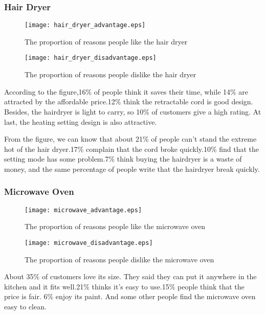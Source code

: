\documentclass{mcmthesis}
\begin{document}
	
	\subsubsection{Hair Dryer}
	\begin{figure}[H]
		\begin{minipage}[t]{0.5\textwidth}
			\centering
			\texttt{[image: hair\_dryer\_advantage.eps]}
			\caption{The proportion of reasons people like the hair dryer}
		\end{minipage}
		\qquad
		\begin{minipage}[t]{0.5\textwidth}
			\centering
			\texttt{[image: hair\_dryer\_disadvantage.eps]}
			\caption{The proportion of reasons people dislike the hair dryer }
		\end{minipage}
	\end{figure}
	
	According to the figure,16\% of people think it saves their time, while 14\% are attracted by the affordable price.12\% think the retractable cord is good design. Besides, the hairdryer is light to carry, so 10\% of customers give a high rating. At last, the heating setting design is also attractive.
	
	From the figure, we can know that about 21\% of people can't stand the extreme hot of the hair dryer.17\% complain that the cord broke quickly.10\% find that the setting mode has some problem.7\% think buying the hairdryer is a waste of money, and the same percentage of people write that the hairdryer break quickly.
	
	\subsubsection{Microwave Oven}
	\begin{figure}[H]
		\begin{minipage}[t]{0.5\textwidth}
			\centering
			\texttt{[image: microwave\_advantage.eps]}
			\caption{The proportion of reasons people like the microwave oven\label{fig:1}}
		\end{minipage}
		\qquad
		\begin{minipage}[t]{0.5\textwidth}
			\centering
			\texttt{[image: microwave\_disadvantage.eps]}
			\caption{The proportion of reasons people dislike the microwave oven\label{fig:2}}
		\end{minipage}
	\end{figure}
	
	About 35\% of customers love its size. They said they can put it anywhere in the kitchen and it fits well.21\% thinks it's easy to use.15\% people think that the price is fair.	6\% enjoy its paint. And some other people find the microwave oven easy to clean.
	
\end{document}
